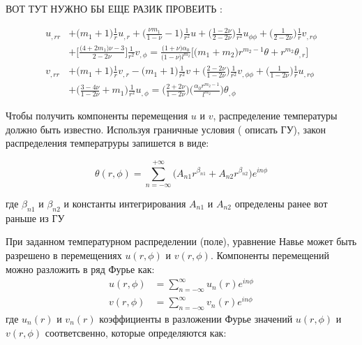 {\color{red} ВОТ ТУТ НУЖНО БЫ ЕЩЕ РАЗИК ПРОВЕИТЬ :

\begin{equation}
	\label{eq:ch2:equation5}
	\begin{split}
		u_{,rr} &+ \big ( m_1+1\big ) \frac{1}{r} u_{,r} + \big ( \frac{\nu m_1}{1-\nu} -1 \big ) \frac{1}{r^2} u + \big ( \frac{1-2\nu}{2-2\nu} \big) \frac{1}{r^2} u_{\phi \phi} + \big ( \frac{1}{2-2\nu}\big ) \frac{1}{r} v_{,r \phi} \\
		&+ \big [ \frac{\big ( 4+2 m_1\big ) \nu -3 }{2-2\nu} \big ] \frac{1}{r^2} v_{, \phi} = \frac{\big ( 1+\nu\big ) \alpha_0 }{\big (1-\nu \big ) l^{m_2}} \Big [ \big (m_1 + m_2 \big ) r^{m_2 -1} \theta + r^{m_2} \theta_{,r}\Big] \\
		v_{,rr} &+ \big (m_1 +1 \big ) \frac{1}{r} v_{,r} - \big (m_1 + 1 \big ) \frac{1}{r^2} v + \big ( \frac{2-2\nu }{1-2\nu } \big ) \frac{1}{r^2} v_{,\phi \phi} + \big ( \frac{1}{1-2\nu} \big ) \frac{1}{r} u_{,r \phi} \\
		&+ \big ( \frac{3-4\nu}{1-2\nu} + m_1\big ) \frac{1}{r^2} u_{, \phi} = \big (\frac{2+2\nu}{1-2\nu} \big ) \big (\frac{\alpha_0 r^{m_2 -1}}{l^{m_2}} \big ) \theta_{,\phi}
	\end{split}
\end{equation}
}


Чтобы получить компоненты перемещения \(u\) и \(v\), распределение температуры должно быть известно. Используя граничные условия ({\color{red} описать ГУ}), закон распределения температруры запишется в виде:

\begin{equation}
	\label{eq:ch2:equation6}
	\theta(r, \phi) = \sum_{n=-\infty}^{+\infty} \big (A_{n1} r^{\beta_{n1}} + A_{n2} r^{\beta_{n2}} \big ) e^{in \phi}
\end{equation}

где \(\beta_{n1}\) и \(\beta_{n2}\) и константы интегрирования \(A_{n1}\) и \(A_{n2}\) определены ранее {\color{red} вот раньше из ГУ} 

При заданном температурном распределении (поле), уравнение Навье может быть разрешено в перемещениях \(u(r, \phi) \) и \(v(r, \phi) \). Компоненты перемещений можно разложить в ряд Фурье как:
\begin{equation}
\label{eq:ch2:equation7}
\begin{split}
	u(r, \phi) &= \sum_{n=-\infty}^{\infty} u_n(r) e^{in\phi}\\
	v(r, \phi) &= \sum_{n=-\infty}^{\infty} v_n(r) e^{in\phi}
\end{split}
\end{equation}
где \(u_n(r)\) и \(v_n(r)\) коэффициенты в разложении Фурье значений \(u(r, \phi)\) и \(v(r, \phi)\) соответсвенно, которые определяются как:

